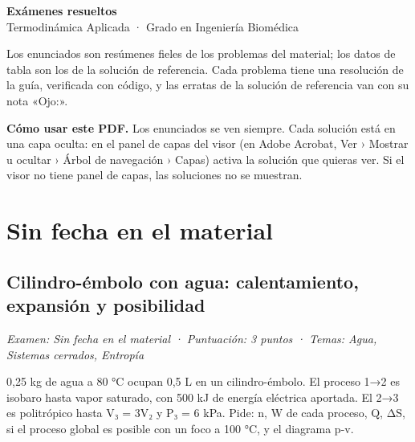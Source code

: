 \documentclass[11pt,a4paper]{article}
\begin{document}
\begin{center}
{\LARGE\bfseries Exámenes resueltos}\\[4pt]
{\large Termodinámica Aplicada · Grado en Ingeniería Biomédica}
\end{center}
\vspace{4pt}
\noindent Los enunciados son resúmenes fieles de los problemas del material; los datos de tabla son los de la solución de referencia. Cada problema tiene una resolución de la guía, verificada con código, y las erratas de la solución de referencia van con su nota «Ojo:».

\noindent\textbf{Cómo usar este PDF.} Los enunciados se ven siempre. Cada solución está en una capa
oculta: en el panel de capas del visor (en Adobe Acrobat, Ver › Mostrar u ocultar › Árbol de navegación › Capas)
activa la solución que quieras ver. Si el visor no tiene panel de capas, las soluciones no se muestran.

\section{Sin fecha en el material}

\subsection{Cilindro-émbolo con agua: calentamiento, expansión y posibilidad}
\noindent\textit{Examen: Sin fecha en el material · Puntuación: 3 puntos · Temas: Agua, Sistemas cerrados, Entropía}\par\medskip

0,25 kg de agua a 80 °C ocupan 0,5 L en un cilindro-émbolo. El proceso 1→2 es isobaro hasta vapor saturado, con 500 kJ de energía eléctrica aportada. El 2→3 es politrópico hasta V₃ = 3V₂ y P₃ = 6 kPa. Pide: n, W de cada proceso, Q, ΔS, si el proceso global es posible con un foco a 100 °C, y el diagrama p-v.
\end{document}
